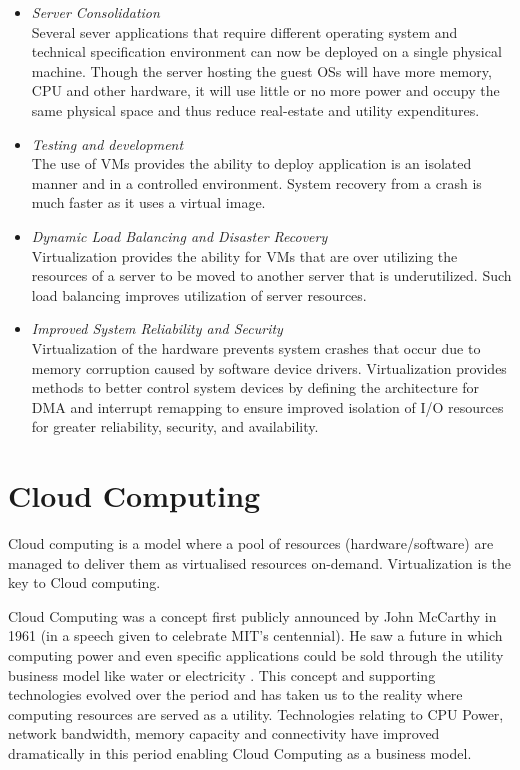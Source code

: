 \documentclass[12pt,a4paper]{report}
\begin{document}
\begin{itemize}
  
\item \emph{Server Consolidation} \\
Several sever applications that require different operating system and technical specification 
environment can now be deployed on a single physical machine. Though the server hosting the guest 
OSs will have more memory, CPU and other hardware, it will use little or no more power and occupy 
the same physical space and thus reduce real-estate and utility expenditures.

\item \emph{Testing and development} \\
The use of VMs provides the ability to deploy application is an isolated manner and
in a controlled environment. System recovery from a crash is much faster as it uses a virtual
image.

\item \emph{Dynamic Load Balancing and Disaster Recovery} \\
Virtualization provides the ability for VMs that are over utilizing  the resources of a server to be moved to 
another server that is underutilized. Such load balancing improves utilization of server resources.

\item \emph{Improved System Reliability and Security} \\
Virtualization of the hardware prevents system crashes that occur due to memory corruption caused by 
software device drivers. Virtualization provides methods to better control system devices by defining the
architecture for DMA and interrupt remapping to ensure improved isolation of I/O resources for greater
reliability, security, and availability.
\end{itemize}

\section{Cloud Computing}

Cloud computing is a model where a pool of resources (hardware/software) are
managed to deliver them as virtualised resources on-demand. Virtualization is the key
to Cloud computing.


Cloud Computing was a concept first publicly announced by John McCarthy in 1961 
(in a speech given to celebrate MIT's centennial). He saw a future in which computing 
power and even specific applications could be sold through the utility 
business model like water or electricity \cite{garfinkel1999architects}.
This concept and  supporting technologies evolved over the period and has taken us 
to the reality where computing resources are served as a utility. 
Technologies relating to CPU Power, network bandwidth, memory capacity 
and connectivity have improved dramatically in this period enabling Cloud Computing as 
a business model.
\end{document}
